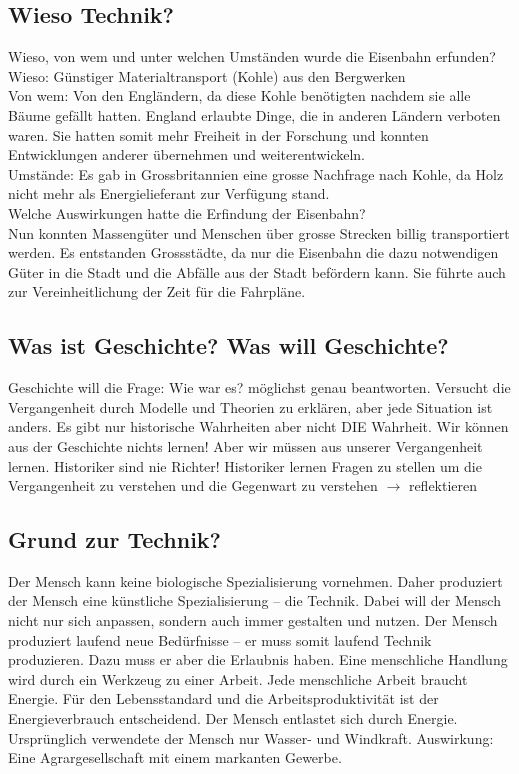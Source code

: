 \documentclass[10pt, openright=true]{scrartcl}
\begin{document}
\subsection{Wieso Technik?}
Wieso, von wem und unter welchen Umständen wurde die Eisenbahn erfunden?\\
Wieso: Günstiger Materialtransport (Kohle) aus den Bergwerken\\
Von wem: Von den Engländern, da diese Kohle benötigten nachdem sie alle Bäume gefällt hatten. England erlaubte Dinge, die in anderen Ländern verboten waren. Sie hatten somit mehr Freiheit in der Forschung und konnten Entwicklungen anderer übernehmen und weiterentwickeln.\\
Umstände: Es gab in Grossbritannien eine grosse Nachfrage nach Kohle, da Holz nicht mehr als Energielieferant zur Verfügung stand.\\
Welche Auswirkungen hatte die Erfindung der Eisenbahn?\\
Nun konnten Massengüter und Menschen über grosse Strecken billig transportiert werden. Es entstanden Grossstädte, da nur die Eisenbahn die dazu notwendigen Güter in die Stadt und die Abfälle aus der Stadt befördern kann. Sie führte auch zur Vereinheitlichung der Zeit für die Fahrpläne. 
\subsection{Was ist Geschichte? Was will Geschichte?}
Geschichte will die Frage: Wie war es? möglichst genau beantworten. Versucht die Vergangenheit durch Modelle und Theorien zu erklären, aber jede Situation ist anders. Es gibt nur historische Wahrheiten aber nicht DIE Wahrheit. Wir können aus der Geschichte nichts lernen! Aber wir müssen aus unserer Vergangenheit lernen. Historiker sind nie Richter! Historiker lernen Fragen zu stellen um die Vergangenheit zu verstehen und die Gegenwart zu verstehen $\rightarrow$ reflektieren
\subsection{Grund zur Technik?}
Der Mensch kann keine biologische Spezialisierung vornehmen. Daher produziert der Mensch eine künstliche Spezialisierung – die Technik. Dabei will der Mensch nicht nur sich anpassen, sondern auch immer gestalten und nutzen. Der Mensch produziert laufend neue Bedürfnisse – er muss somit laufend Technik produzieren. Dazu muss er aber die Erlaubnis haben. Eine menschliche Handlung wird durch ein Werkzeug zu einer Arbeit. Jede menschliche Arbeit braucht Energie. Für den Lebensstandard und die Arbeitsproduktivität ist der Energieverbrauch entscheidend. Der Mensch entlastet sich durch Energie. Ursprünglich verwendete der Mensch nur Wasser- und Windkraft. Auswirkung: Eine Agrargesellschaft
mit einem markanten Gewerbe. 
\end{document}
